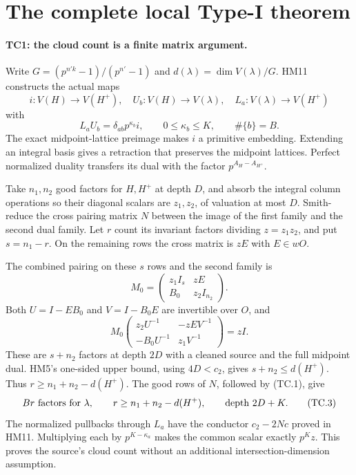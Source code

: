 \section{The complete local Type-I theorem}
\label{sec:type-one-closure}


\paragraph{TC1: the cloud count is a finite matrix argument.}
Write $G=(p^{n'k}-1)/(p^{n'}-1)$ and
$d(\lambda)=\dim V(\lambda)/G$. HM11 constructs the actual maps
\[
 i:V(H)\longrightarrow V(H^+),\quad
 U_b:V(H)\longrightarrow V(\lambda),\quad
 L_a:V(\lambda)\longrightarrow V(H^+)
\]
with
\[
 L_aU_b=\delta_{ab}p^{\kappa_b}i,\qquad
 0\le\kappa_b\le K,\qquad \#\{b\}=B.                    \tag{TC.1}
\]
The exact midpoint-lattice preimage makes $i$ a primitive
embedding. Extending an integral basis gives a retraction that
preserves the midpoint lattices. Perfect normalized duality
transfers its dual with the factor $p^{A_H-A_{H^+}}$.

Take $n_1,n_2$ good factors for $H,H^+$ at depth $D$, and
absorb the integral column operations so their diagonal scalars
are $z_1,z_2$, of valuation at most $D$. Smith-reduce the cross
pairing matrix $N$ between the image of the first family and
the second dual family. Let $r$ count its invariant factors
dividing $z=z_1z_2$, and put $s=n_1-r$. On the remaining rows
the cross matrix is $zE$ with $E\in wO$.

The combined pairing on these $s$ rows and the second family is
\[
 M_0=\begin{pmatrix}z_1I_s&zE\\ B_0&z_2I_{n_2}\end{pmatrix}.
\]
Both $U=I-EB_0$ and $V=I-B_0E$ are invertible over $O$, and
\[
 M_0
 \begin{pmatrix}
 z_2U^{-1}&-zEV^{-1}\\ -B_0U^{-1}&z_1V^{-1}
 \end{pmatrix}
       =zI.                                             \tag{TC.2}
\]
These are $s+n_2$ factors at depth $2D$ with a cleaned source
and the full midpoint dual. HM5's one-sided upper bound, using
$4D<c_2$, gives $s+n_2\le d(H^+)$. Thus
$r\ge n_1+n_2-d(H^+)$.
The good rows of $N$, followed by (TC.1), give
\[
 Br\ \hbox{factors for }\lambda,\qquad
 r\ge n_1+n_2-d(H^+),\qquad
 \hbox{depth }2D+K.                                    \tag{TC.3}
\]
The normalized pullbacks through $L_a$ have the conductor
$c_2-2Nc$ proved in HM11. Multiplying each by
$p^{K-\kappa_a}$ makes the common scalar exactly $p^Kz$.
This proves the source's cloud count without an additional
intersection-dimension assumption.


